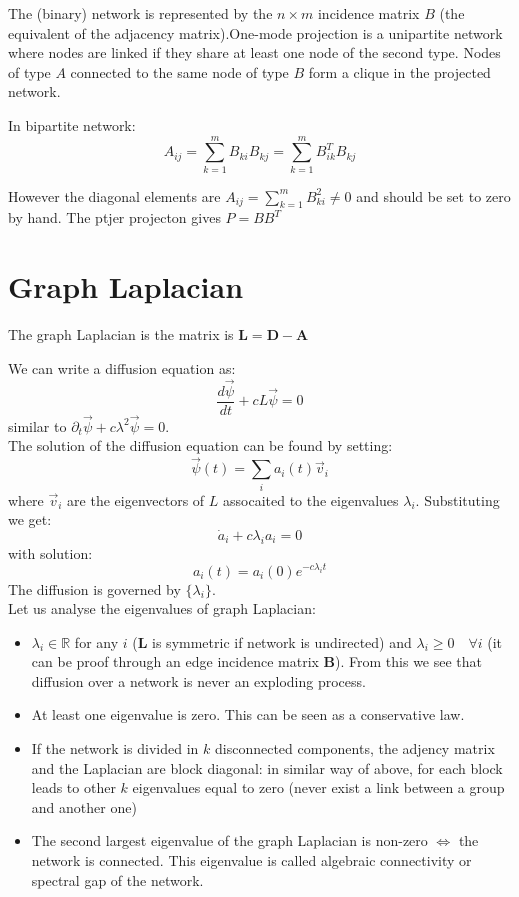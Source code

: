 The (binary) network is represented by the $n\times m$ incidence matrix $B$ (the equivalent of the adjacency matrix).One-mode projection is a unipartite network where nodes are linked if they share at least one node of the second type. Nodes of type $A$ connected to the same node of type $B$ form a clique in the projected network. 
\begin{mydefinition}
In bipartite network:
\[
A_{ij} = \sum_{k=1}^{m}B_{ki} B_{kj} = \sum_{k=1}^{m} B_{ik}^TB_{kj} 
\]
\end{mydefinition}
However the diagonal elements are $A_{ij} = \sum_{k=1}^m B_{ki}^2 \neq 0$ and should be set to zero by hand.
The ptjer projecton gives $P = BB^T$
\newpage
\section{Graph Laplacian}
\begin{mydefinition}
	The graph Laplacian is the matrix is $\mathbf{L} = \mathbf{D} - \mathbf{A}$
\end{mydefinition}
We can write a diffusion equation as:
\[
\frac{d \vec{\psi}}{dt} + cL \vec{\psi} = 0
\]
similar to $\partial_t \vec{\psi} + c \lambda^2 \vec{\psi} = 0$.\\
The solution of the diffusion equation can be found by setting:
\[
\vec{\psi}(t) = \sum_i a_i(t) \vec{v}_i
\]
where $\vec{v}_i$ are the eigenvectors of $L$ assocaited to the eigenvalues $\lambda_i$. Substituting we get:
\[
\dot{a}_i + c\lambda_i a_i = 0
\]
with solution:
\[
a_i(t) = a_i(0)e^{-c\lambda_it}
\]
The diffusion is governed by $\{\lambda_i\}$.\\
Let us analyse the eigenvalues of graph Laplacian:
\begin{itemize}
\item $\lambda_i \in \mathbb{R}$ for any $i$ ($\mathbf{L}$ is symmetric if network is undirected) and $\lambda_i \geq 0 \quad \forall i$ (it can be proof through an edge incidence matrix $\mathbf{B}$). From this we see that diffusion over a network is never an exploding process.
\item At least one eigenvalue is zero. This can be seen as a conservative law.
\item If the network is divided in $k$ disconnected components, the adjency matrix and the Laplacian are block diagonal: in similar way of above, for each block leads to other $k$ eigenvalues equal to zero (never exist a link between a group and another one)
\item The second largest eigenvalue of the graph Laplacian is non-zero $\iff$ the network is connected. This eigenvalue is called algebraic connectivity or spectral gap of the network.
\end{itemize}
